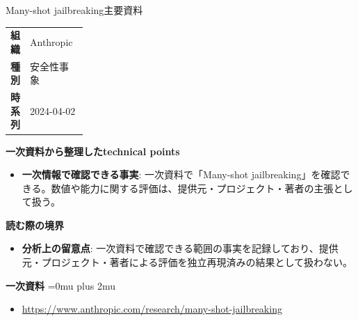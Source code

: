 \begin{technicalnote}{Many-shot jailbreaking}{主要資料}
\begingroup
\begin{tabularx}{\linewidth}{@{}>{\bfseries}p{0.22\linewidth}X@{}}
組織 & Anthropic \\
種別 & 安全性事象 \\
時系列 & 2024-04-02 \\
\end{tabularx}
\smallskip
{\bfseries 一次資料から整理したtechnical points}
\begin{itemize}[leftmargin=1.5em,itemsep=0.35em]
\item \textbf{一次情報で確認できる事実}: 一次資料で「Many-shot jailbreaking」を確認できる。数値や能力に関する評価は、提供元・プロジェクト・著者の主張として扱う。
\end{itemize}
\begin{minipage}{\linewidth}
{\bfseries 読む際の境界}
\begin{itemize}[leftmargin=1.5em,itemsep=0.35em]
\item \textbf{分析上の留意点}: 一次資料で確認できる範囲の事実を記録しており、提供元・プロジェクト・著者による評価を独立再現済みの結果として扱わない。
\end{itemize}
\begin{samepage}
{\bfseries 一次資料}
\begingroup\sloppy
\Urlmuskip=0mu plus 2mu\relax
\begin{itemize}[leftmargin=1.5em,itemsep=0.25em]
\item {\scriptsize\url{https://www.anthropic.com/research/many-shot-jailbreaking}}
\end{itemize}
\endgroup
\end{samepage}
\end{minipage}
\endgroup
\end{technicalnote}
\medskip

